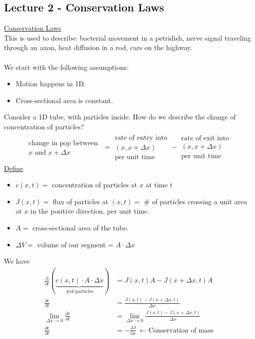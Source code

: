 \documentclass[12pt, letterpaper]{article}
\begin{document}
\subsection{Lecture 2 - Conservation Laws}
\underline{Conservation Laws} \\
This is used to describe: bacterial movement in a petridish, nerve signal traveling 
through an axon, heat diffusion in a rod, cars on the highway. \\ \\ 
We start with the following assumptions:
\begin{itemize}
    \item Motion happens in 1D.
    \item Cross-sectional area is constant.
\end{itemize}
Consider a 1D tube, with particles inside. How do we describe the change of 
concentration of particles?
\begin{align*}
    \begin{matrix}
    \text{change in pop between } \\ x \text{ and } x + \Delta x
    \end{matrix} = 
    \begin{matrix}
        \text{rate of entry into} \\ (x,x+\Delta x) \\ \text{per unit time}
    \end{matrix} - 
    \begin{matrix}
        \text{rate of exit into} \\ (x,x+\Delta x) \\ \text{per unit time}
    \end{matrix}
\end{align*}
\underline{Define}
\begin{itemize}
    \item $c(x,t) = $ concentration of particles at $x$ at time $t$
    \item $J(x,t) = $ flux of particles at $(x,t) = $ \# of particles
    crossing a unit area at $x$ in the positive direction, per unit time.
    \item $A = $ cross-sectional area of the tube.
    \item $\Delta V = $ volume of our segment = $A\cdot \Delta x$  
\end{itemize}
We have 
\begin{align*}
    \frac{\partial}{\partial t} (\underbrace{c(x,t)\cdot A\cdot \Delta x}_{\text{\# of particles}})
    &= J(x,t)A - J(x+\Delta x,t)A \\
    \frac{\partial c}{\partial t} &= \frac{J(x,t) - J(x+\Delta x, t)}{\Delta x} \\
    \lim_{\Delta x \rightarrow 0} \frac{\partial c}{\partial t} &= \lim_{\Delta x \rightarrow 0}\frac{J(x,t) - J(x+\Delta x, t)}{\Delta x} \\
    \frac{\partial c}{\partial t} &= -\frac{\partial J}{\partial x}\ \leftarrow \text{Conservation of mass}
\end{align*}
\end{document}
